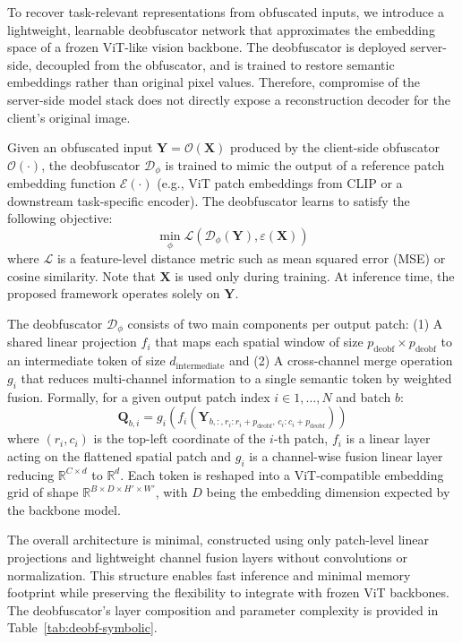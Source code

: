 \documentclass{ieeeaccess}
\newcommand{\rev}[1]{{\color{green}#1}}
\begin{document}
\rev{To recover task-relevant representations from obfuscated inputs, we introduce a lightweight, learnable deobfuscator network that approximates the embedding space of a frozen ViT-like vision backbone. The deobfuscator is deployed server-side, decoupled from the obfuscator, and is trained to restore semantic embeddings rather than original pixel values. Therefore, compromise of the server-side model stack does not directly expose a reconstruction decoder for the client's original image.}

Given an obfuscated input $\mathbf{Y} = \mathcal{O}(\mathbf{X})$ produced by the client-side obfuscator $\mathcal{O}(\cdot)$, the deobfuscator $\mathcal{D}_\phi$ is trained to mimic the output of a reference patch embedding function $\mathcal{E}(\cdot)$ (e.g., ViT patch embeddings from CLIP or a downstream task-specific encoder). The deobfuscator learns to satisfy the following objective:
\begin{equation}
    \min_{\phi} \mathcal{L}(\mathcal{D}_\phi(\mathbf{Y}),\varepsilon(\mathbf{X}))
\end{equation}
where $\mathcal{L}$ is a feature-level distance metric such as mean squared error (MSE) or cosine similarity. Note that $\mathbf{X}$ is used only during training. At inference time, the proposed framework operates solely on $\mathbf{Y}$.

The deobfuscator $\mathcal{D}_\phi$ consists of two main components per output patch: (1) A shared linear projection $f_i$ that maps each spatial window of size $p_{\text{deobf}} \times p_{\text{deobf}}$ to an intermediate token of size $d_{\text{intermediate}}$ and (2) A cross-channel merge operation $g_i$ that reduces multi-channel information to a single semantic token by weighted fusion. Formally, for a given output patch index $i \in {1, \dots, N}$ and batch $b$:
\begin{equation}
    \mathbf{Q}_{b,i} = g_i\left( f_i\left( \mathbf{Y}_{b,:,r_i:r_i+p_{\text{deobf}},\,c_i:c_i+p_{\text{deobf}}} \right) \right)
\end{equation}
where $(r_i, c_i)$ is the top-left coordinate of the $i$-th patch, $f_i$ is a linear layer acting on the flattened spatial patch and $g_i$ is a channel-wise fusion linear layer reducing $\mathbb{R}^{C \times d}$ to $\mathbb{R}^{d}$. Each token is reshaped into a ViT-compatible embedding grid of shape $\mathbb{R}^{B \times D \times H' \times W'}$, with $D$ being the embedding dimension expected by the backbone model.

The overall architecture is minimal, constructed using only patch-level linear projections and lightweight channel fusion layers without convolutions or normalization. This structure enables fast inference and minimal memory footprint while preserving the flexibility to integrate with frozen ViT backbones. The deobfuscator's layer composition and parameter complexity is provided in Table~\ref{tab:deobf-symbolic}.
\end{document}

